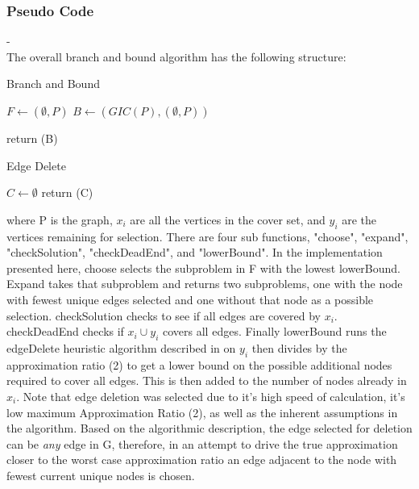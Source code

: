 \documentclass[acmlarge]{acmart}
\begin{document}
\subsubsection{Pseudo Code}
-\\
The overall branch and bound algorithm has the following structure:\\
\begin{algorithm}[H]
	\caption{Branch and Bound}
	\SetAlgoLined
	
	$F \leftarrow {(\emptyset,P)}$\;
	$B \leftarrow {(GIC(P),(\emptyset,P))}$\;
	
	return (B)
\end{algorithm}
\begin{algorithm}[H]
	\caption{Edge Delete}
	\SetAlgoLined
	
	$C \leftarrow \emptyset$\;
	return (C)
\end{algorithm}
where P is the graph, $x_i$ are all the vertices in the cover set, and $y_i$ are the vertices remaining for selection. There are four sub functions, "choose", "expand", "checkSolution", "checkDeadEnd", and "lowerBound". In the implementation presented here, choose selects the subproblem in F with the lowest lowerBound. Expand takes that subproblem and returns two subproblems, one with the node with fewest unique edges selected and one without that node as a possible selection. checkSolution checks to see if all edges are covered by $x_i$. checkDeadEnd checks if $x_i \cup y_i$ covers all edges. Finally lowerBound runs the edgeDelete heuristic algorithm described in \cite{Fran10} on $y_i$ then divides by the approximation ratio (2) to get a lower bound on the possible additional nodes required to cover all edges. This is then added to the number of nodes already in $x_i$.
Note that edge deletion was selected due to it's high speed of calculation, it's low maximum Approximation Ratio (2), as well as the inherent assumptions in the algorithm. Based on the algorithmic description, the edge selected for deletion can be \textit{any} edge in G, therefore, in an attempt to drive the true approximation closer to the worst case approximation ratio an edge adjacent to the node with fewest current unique nodes is chosen.
\end{document}

